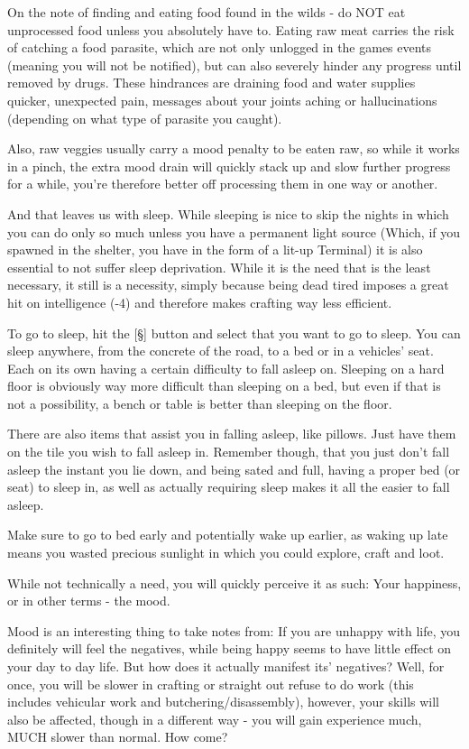 On the note of finding and eating food found in the wilds - do NOT eat unprocessed food unless you absolutely have to. Eating raw meat carries the risk of catching a food parasite, which are not only unlogged in the games events (meaning you will not be notified), but can also severely hinder any progress until removed by drugs. These hindrances are draining food and water supplies quicker, unexpected pain, messages about your joints aching or hallucinations (depending on what type of parasite you caught).

Also, raw veggies usually carry a mood penalty to be eaten raw, so while it works in a pinch, the extra mood drain will quickly stack up and slow further progress for a while, you're therefore better off processing them in one way or another.

And that leaves us with sleep. While sleeping is nice to skip the nights in which you can do only so much unless you have a permanent light source (Which, if you spawned in the shelter, you have in the form of a lit-up Terminal) it is also essential to not suffer sleep deprivation. While it is the need that is the least necessary, it still is a necessity, simply because being dead tired imposes a great hit on intelligence (-4) and therefore makes crafting way less efficient.

To go to sleep, hit the [\S] button and select that you want to go to sleep. You can sleep anywhere, from the concrete of the road, to a bed or in a vehicles' seat. Each on its own having a certain difficulty to fall asleep on. Sleeping on a hard floor is obviously way more difficult than sleeping on a bed, but even if that is not a possibility, a bench or table is better than sleeping on the floor. 

There are also items that assist you in falling asleep, like pillows. Just have them on the tile you wish to fall asleep in. Remember though, that you just don't fall asleep the instant you lie down, and being sated and full, having a proper bed (or seat) to sleep in, as well as actually requiring sleep makes it all the easier to fall asleep.

Make sure to go to bed early and potentially wake up earlier, as waking up late means you wasted precious sunlight in which you could explore, craft and loot.

While not technically a need, you will quickly perceive it as such: Your happiness, or in other terms - the mood.

Mood is an interesting thing to take notes from: If you are unhappy with life, you definitely will feel the negatives, while being happy seems to have little effect on your day to day life. But how does it actually manifest its' negatives? Well, for once, you will be slower in crafting or straight out refuse to do work (this includes vehicular work and butchering/disassembly), however, your skills will also be affected, though in a different way - you will gain experience much, MUCH slower than normal. How come?

